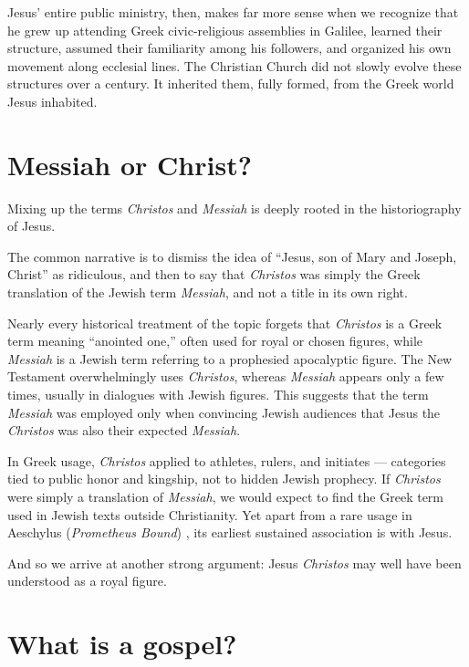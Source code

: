 Jesus' entire public ministry, then, makes far more sense when we recognize that he grew up attending Greek civic-religious assemblies in Galilee, learned their structure, assumed their familiarity among his followers, and organized his own movement along ecclesial lines.
The Christian Church did not slowly evolve these structures over a century.
It inherited them, fully formed, from the Greek world Jesus inhabited.

\section{Messiah or Christ?}\label{sec:messiah-or-christ}

Mixing up the terms \emph{Christos} and \emph{Messiah} is deeply rooted in the historiography of Jesus.

The common narrative is to dismiss the idea of “Jesus, son of Mary and Joseph, Christ” as ridiculous, and then to say that \emph{Christos} was simply the Greek translation of the Jewish term \emph{Messiah}, and not a title in its own right.

Nearly every historical treatment of the topic forgets that \emph{Christos} is a Greek term meaning “anointed one,” often used for royal or chosen figures, while \emph{Messiah} is a Jewish term referring to a prophesied apocalyptic figure.
The New Testament overwhelmingly uses \emph{Christos}, whereas \emph{Messiah} appears only a few times, usually in dialogues with Jewish figures.
This suggests that the term \emph{Messiah} was employed only when convincing Jewish audiences that Jesus the \emph{Christos} was also their expected \emph{Messiah}.

In Greek usage, \emph{Christos} applied to athletes, rulers, and initiates --- categories tied to public honor and kingship, not to hidden Jewish prophecy.
If \emph{Christos} were simply a translation of \emph{Messiah}, we would expect to find the Greek term used in Jewish texts outside Christianity.
Yet apart from a rare usage in Aeschylus (\emph{Prometheus Bound}) \cite{aeschylus:prometheus}, its earliest sustained association is with Jesus.

And so we arrive at another strong argument: Jesus \emph{Christos} may well have been understood as a royal figure.

\section{What is a gospel?}\label{sec:what-is-a-gospel}

